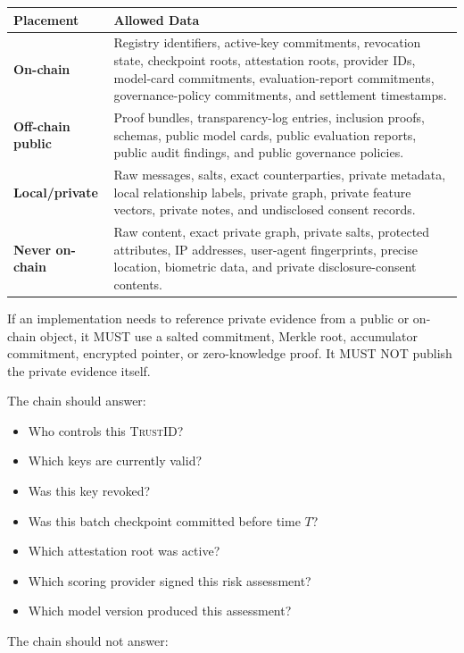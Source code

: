 \documentclass[11pt]{article}
\newcommand{\TrustID}{\textsc{TrustID}}
\begin{document}
\begin{center}
\begin{tabularx}{\textwidth}{>{\bfseries}p{} X}
\toprule
Placement & Allowed Data \\
\midrule
On-chain & Registry identifiers, active-key commitments, revocation state, checkpoint roots, attestation roots, provider IDs, model-card commitments, evaluation-report commitments, governance-policy commitments, and settlement timestamps. \\
Off-chain public & Proof bundles, transparency-log entries, inclusion proofs, schemas, public model cards, public evaluation reports, public audit findings, and public governance policies. \\
Local/private & Raw messages, salts, exact counterparties, private metadata, local relationship labels, private graph, private feature vectors, private notes, and undisclosed consent records. \\
Never on-chain & Raw content, exact private graph, private salts, protected attributes, IP addresses, user-agent fingerprints, precise location, biometric data, and private disclosure-consent contents. \\
\bottomrule
\end{tabularx}
\end{center}

If an implementation needs to reference private evidence from a public or on-chain object, it MUST use a salted commitment, Merkle root, accumulator commitment, encrypted pointer, or zero-knowledge proof. It MUST NOT publish the private evidence itself.

The chain should answer:

\begin{itemize}
    \item Who controls this \TrustID{}?
    \item Which keys are currently valid?
    \item Was this key revoked?
    \item Was this batch checkpoint committed before time \(T\)?
    \item Which attestation root was active?
    \item Which scoring provider signed this risk assessment?
    \item Which model version produced this assessment?
\end{itemize}

The chain should not answer:
\end{document}
